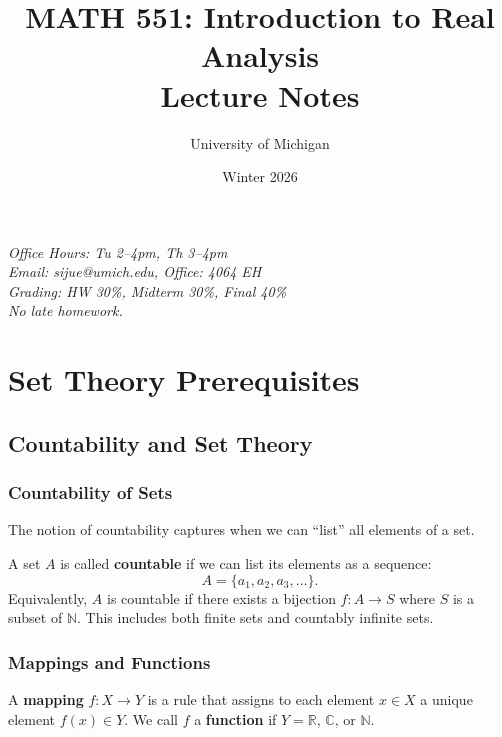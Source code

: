 \documentclass[11pt]{report}
\title{\textbf{MATH 551: Introduction to Real Analysis} \\ \large Lecture Notes}
\author{University of Michigan}
\date{Winter 2026}
\begin{document}
\maketitle

\begin{center}
\textit{Office Hours: Tu 2--4pm, Th 3--4pm} \\
\textit{Email: sijue@umich.edu, Office: 4064 EH} \\[0.5em]
\textit{Grading: HW 30\%, Midterm 30\%, Final 40\%} \\
\textit{No late homework.}
\end{center}

\tableofcontents
\newpage


\chapter{Set Theory Prerequisites}

\section{Countability and Set Theory}

\subsection{Countability of Sets}

The notion of countability captures when we can ``list'' all elements of a set.

\begin{defbox}
A set $A$ is called \textbf{countable} if we can list its elements as a sequence:
\[
A = \{a_1, a_2, a_3, \ldots\}.
\]
Equivalently, $A$ is countable if there exists a bijection $f: A \to S$ where $S$ is a subset of $\mathbb{N}$. This includes both finite sets and countably infinite sets.
\end{defbox}

\subsection{Mappings and Functions}

\begin{defbox}[Mapping]
A \textbf{mapping} $f: X \to Y$ is a rule that assigns to each element $x \in X$ a unique element $f(x) \in Y$. We call $f$ a \textbf{function} if $Y = \mathbb{R}$, $\mathbb{C}$, or $\mathbb{N}$.
\end{defbox}
\end{document}

